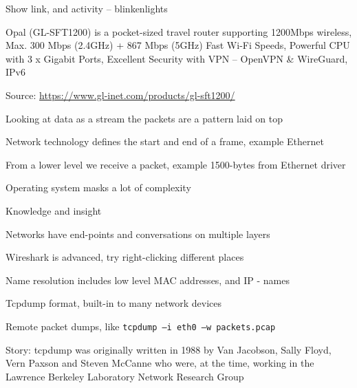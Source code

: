 \documentclass[Screen16to9,17pt]{foils}
\begin{document}
\centerline{Show link, and activity -- blinkenlights}




\begin{list2}
\item Opal (GL-SFT1200) is a pocket-sized travel router supporting 1200Mbps wireless,
Max. 300 Mbps (2.4GHz) + 867 Mbps (5GHz) Fast Wi-Fi Speeds, Powerful CPU with 3 x Gigabit Ports,
Excellent Security with VPN -- OpenVPN \& WireGuard, IPv6
\end{list2}
Source: \url{https://www.gl-inet.com/products/gl-sft1200/}



\begin{list1}
\item Looking at data as a stream the packets are a pattern laid on top
\item Network technology defines the start and end of a frame, example Ethernet
\item From a lower level we receive a packet, example 1500-bytes from Ethernet driver
\item Operating system masks a lot of complexity
\end{list1}



{\Large Knowledge and insight}
\begin{list2}
\item Networks have end-points and conversations on multiple layers
\item Wireshark is advanced, try right-clicking different places
\item Name resolution includes low level MAC addresses, and IP - names
\end{list2}

\begin{list2}
\item Tcpdump format, built-in to many network devices
\item Remote packet dumps, like \verb+tcpdump –i eth0 –w packets.pcap+
\item Story: tcpdump was originally written in 1988 by Van Jacobson, Sally Floyd, Vern Paxson and Steven McCanne who were, at the time, working in the Lawrence Berkeley Laboratory Network Research Group\\
\end{list2}
\end{document}
